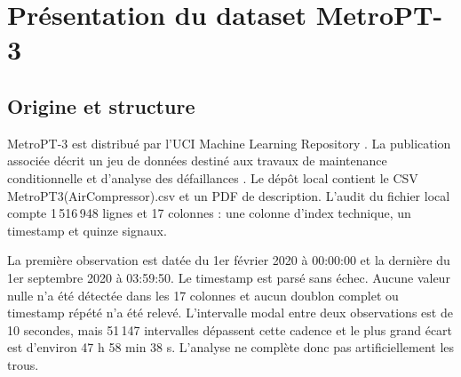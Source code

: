 \chapter{Présentation du dataset MetroPT-3}

\section{Origine et structure}
MetroPT-3 est distribué par l'UCI Machine Learning Repository \cite{uciMetroPT}. La publication associée décrit un jeu de données destiné aux travaux de maintenance conditionnelle et d'analyse des défaillances \cite{veloso2022}. Le dépôt local contient le CSV MetroPT3(AirCompressor).csv et un PDF de description. L'audit du fichier local compte 1\,516\,948 lignes et 17 colonnes : une colonne d'index technique, un timestamp et quinze signaux.

La première observation est datée du 1er février 2020 à 00:00:00 et la dernière du 1er septembre 2020 à 03:59:50. Le timestamp est parsé sans échec. Aucune valeur nulle n'a été détectée dans les 17 colonnes et aucun doublon complet ou timestamp répété n'a été relevé. L'intervalle modal entre deux observations est de 10 secondes, mais 51\,147 intervalles dépassent cette cadence et le plus grand écart est d'environ 47 h 58 min 38 s. L'analyse ne complète donc pas artificiellement les trous.


